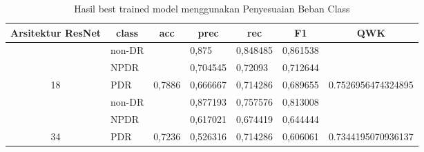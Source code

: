 \begin{table}[hbtp]
	\begin{center}
		\caption{Hasil best trained model menggunakan Penyesuaian Beban Class}
		\label{tb:HasilTrainClassWeight}
		\begin{tabular}{|c|l|c|l|l|l|c|}
			\hline
			\rowcolor[HTML]{C0C0C0} 
			Arsitektur ResNet   & \multicolumn{1}{c|}{\cellcolor[HTML]{C0C0C0}class} & acc                      & \multicolumn{1}{c|}{\cellcolor[HTML]{C0C0C0}prec} & \multicolumn{1}{c|}{\cellcolor[HTML]{C0C0C0}rec} & \multicolumn{1}{c|}{\cellcolor[HTML]{C0C0C0}F1} & QWK                                  \\ \hline
			& non-DR                                             &                          & 0,875                                             & 0,848485                                         & 0,861538                                        &                                      \\ \cline{2-2} \cline{4-6}
			& NPDR                                               &                          & 0,704545                                          & 0,72093                                          & 0,712644                                        &                                      \\ \cline{2-2} \cline{4-6}
			\multirow{-3}{*}{18}  & PDR                                                & \multirow{-3}{*}{0,7886} & 0,666667                                          & 0,714286                                         & 0,689655                                        & \multirow{-3}{*}{0.7526956474324895} \\ \hline
			& non-DR                                             &                          & 0,877193                                          & 0,757576                                         & 0,813008                                        &                                      \\ \cline{2-2} \cline{4-6}
			& NPDR                                               &                          & 0,617021                                          & 0,674419                                         & 0,644444                                        &                                      \\ \cline{2-2} \cline{4-6}
			\multirow{-3}{*}{34}  & PDR                                                & \multirow{-3}{*}{0,7236} & 0,526316                                          & 0,714286                                         & 0,606061                                        & \multirow{-3}{*}{0.7344195070936137} \\ \hline

\end{tabular}
\end{center}
\end{table}
